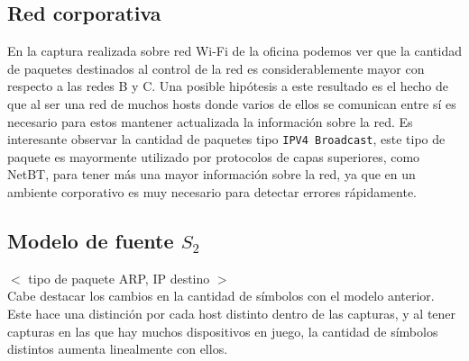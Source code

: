 \subsection{Red corporativa}

En la captura realizada sobre red Wi-Fi de la oficina podemos ver que la cantidad de paquetes destinados al control de la red es considerablemente mayor con respecto a las redes B y C. Una posible hipótesis a este resultado es el hecho de que al ser una red de muchos hosts donde varios de ellos se comunican entre sí es necesario para estos mantener actualizada la información sobre la red. Es interesante observar la cantidad de paquetes tipo \texttt{IPV4 Broadcast}, este tipo de paquete es mayormente utilizado por protocolos de capas superiores, como NetBT, para tener más una mayor información sobre la red, ya que en un ambiente corporativo es muy necesario para detectar errores rápidamente.


\subsection{Modelo de fuente $S_2$}


$<$ tipo de paquete ARP, IP destino $>$ \\


Cabe destacar los cambios en la cantidad de símbolos con el modelo anterior. Este hace una distinción por cada host distinto dentro de las capturas, y al tener capturas en las que hay muchos dispositivos en juego, la cantidad de símbolos distintos aumenta linealmente con ellos.

 